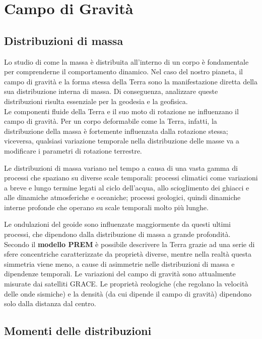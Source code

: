 \documentclass[a4paper,12pt]{book}
\begin{document}
\section{\textcolor{colore7}{Campo di Gravità}}

\subsection{\textcolor{colore2}{Distribuzioni di massa}}

Lo studio di come la massa è distribuita all'interno di un corpo è fondamentale per comprenderne il comportamento dinamico.
Nel caso del nostro pianeta, il campo di gravità e la forma stessa della Terra sono la manifestazione diretta della sua distribuzione interna di massa.
Di conseguenza, analizzare queste distribuzioni risulta essenziale per la geodesia e la geofisica.\\

\noindent
Le componenti fluide della Terra e il suo moto di rotazione ne influenzano il campo di gravità.
Per un corpo deformabile come la Terra, infatti, la distribuzione della massa è fortemente influenzata dalla rotazione stessa; viceversa, qualsiasi variazione temporale nella distribuzione delle masse va a modificare i parametri di rotazione terrestre.


Le distribuzioni di massa variano nel tempo a causa di una vasta gamma di processi che spaziano su diverse scale temporali:
processi climatici come variazioni a breve e lungo termine legati al ciclo dell'acqua, allo scioglimento dei ghiacci e alle dinamiche atmosferiche e oceaniche;
processi geologici, quindi dinamiche interne profonde che operano su scale temporali molto più lunghe.

Le ondulazioni del geoide sono influenzate maggiormente da questi ultimi processi, che dipendono dalla distribuzione di massa a grande profondità.\\

\noindent
Secondo il \textbf{modello PREM} è possibile descrivere la Terra grazie ad una serie di sfere concentriche caratterizzate da proprietà diverse, mentre nella realtà questa simmetria viene meno, a cause di asimmetrie nelle distribuzioni di massa e dipendenze temporali.
Le variazioni del campo di gravità sono attualmente misurate dai satelliti GRACE.
Le proprietà reologiche (che regolano la velocità delle onde sismiche) e la densità (da cui dipende il campo di gravità) dipendono solo dalla distanza dal centro.

\subsection{\textcolor{colore7}{Momenti delle distribuzioni}}
\end{document}
